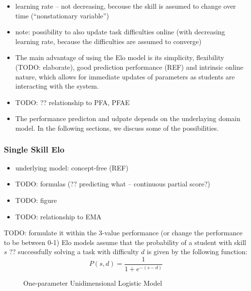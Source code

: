 \begin{itemize}
\item learning rate -- not decreasing, becouse the skill is assumed to change over time
  (``nonstationary variable'')
  \cite{student-models-recent-data}
\item note: possibility to also update task difficulties online (with
  decreasing learning rate, because the difficulties are assumed to converge)
\item The main advantage of using the Elo model is its simplicity, flexibility (TODO: elaborate),
  good prediction performance (REF) and intrinsic online nature, which allows for immediate
  updates of parameters as students are interacting with the system.
\item TODO: ?? relationship to PFA, PFAE
\item The performance predicton and udpate depends on the underlaying domain model.
  In the following sections, we discuss some of the possibilities.
\end{itemize}

\subsubsection{Single Skill Elo}

\begin{itemize}
\item underlying model: concept-free (REF)
\item TODO: formulas (?? predicting what -- continuous partial score?)
\item TODO: figure
\item TODO: relationship to EMA
\end{itemize}

TODO: formulate it within the 3-value performance (or change the performance to be between 0-1)
Elo models assume  that the probability of a student with skill $s$
?? successfully solving a task with difficulty $d$
is given by the following function:
\begin{equation}\label{eq:logistic}
P(s, d) = \frac{1}{1 + e^{-(s - d)}}
\end{equation}

\begin{figure}[h]
  \centering
  \caption{One-parameter Unidimensional Logistic Model}
  \label{fig:logistic-model}
\end{figure}


